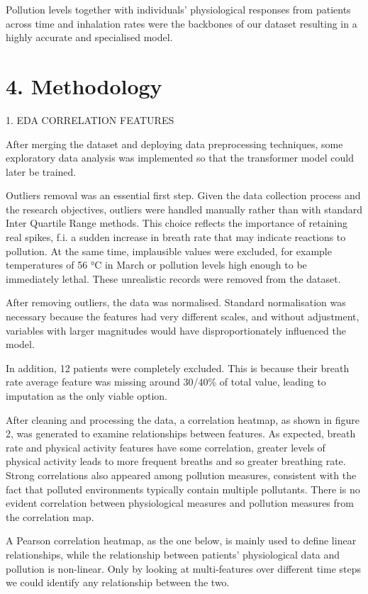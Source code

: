 \documentclass[
]{article}
\begin{document}
Pollution levels together with individuals' physiological responses from
patients across time and inhalation rates were the backbones of our
dataset resulting in a highly accurate and specialised model.

\hypertarget{methodology}{%
\section{4. Methodology}\label{methodology}}

1. EDA CORRELATION FEATURES

After merging the dataset and deploying data preprocessing techniques,
some exploratory data analysis was implemented so that the transformer
model could later be trained.

Outliers removal was an essential first step. Given the data collection
process and the research objectives, outliers were handled manually
rather than with standard Inter Quartile Range methods. This choice
reflects the importance of retaining real spikes, f.i. a sudden increase
in breath rate that may indicate reactions to pollution. At the same
time, implausible values were excluded, for example temperatures of 56
°C in March or pollution levels high enough to be immediately lethal.
These unrealistic records were removed from the dataset.

After removing outliers, the data was normalised. Standard normalisation
was necessary because the features had very different scales, and
without adjustment, variables with larger magnitudes would have
disproportionately influenced the model.

In addition, 12 patients were completely excluded. This is because their
breath rate average feature was missing around 30/40\% of total value,
leading to imputation as the only viable option.

After cleaning and processing the data, a correlation heatmap, as shown
in figure 2, was generated to examine relationships between features. As
expected, breath rate and physical activity features have some
correlation, greater levels of physical activity leads to more frequent
breaths and so greater breathing rate. Strong correlations also appeared
among pollution measures, consistent with the fact that polluted
environments typically contain multiple pollutants. There is no evident
correlation between physiological measures and pollution measures from
the correlation map.

A Pearson correlation heatmap, as the one below, is mainly used to
define linear relationships, while the relationship between patients'
physiological data and pollution is non-linear. Only by looking at
multi-features over different time steps we could identify any
relationship between the two.
\end{document}
